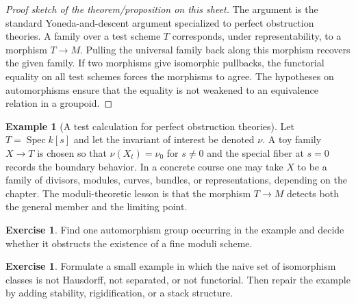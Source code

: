 \documentclass[11pt]{amsart}
\theoremstyle{definition}
\newtheorem{example}[theorem]{Example}
\newtheorem{exercise}[theorem]{Exercise}
\newcommand{\Spec}{\operatorname{Spec}}
\begin{document}
\begin{proof}[Proof sketch of the theorem/proposition on this sheet]
The argument is the standard Yoneda-and-descent argument specialized to perfect obstruction theories.  A family over a test scheme $T$ corresponds, under representability, to a morphism $T\to M$.  Pulling the universal family back along this morphism recovers the given family.  If two morphisms give isomorphic pullbacks, the functorial equality on all test schemes forces the morphisms to agree.  The hypotheses on automorphisms ensure that the equality is not weakened to an equivalence relation in a groupoid.
\end{proof}
\begin{example}[A test calculation for perfect obstruction theories]
Let $T=\Spec k[s]$ and let the invariant of interest be denoted $\nu$.  A toy family $X\to T$ is chosen so that $\nu(X_t)=\nu_0$ for $s\ne0$ and the special fiber at $s=0$ records the boundary behavior.  In a concrete course one may take $X$ to be a family of divisors, modules, curves, bundles, or representations, depending on the chapter.  The moduli-theoretic lesson is that the morphism $T\to M$ detects both the general member and the limiting point.
\end{example}
\begin{exercise}
Find one automorphism group occurring in the example and decide whether it obstructs the existence of a fine moduli scheme.
\end{exercise}
\begin{exercise}
Formulate a small example in which the naive set of isomorphism classes is not Hausdorff, not separated, or not functorial.  Then repair the example by adding stability, rigidification, or a stack structure.
\end{exercise}
\clearpage
\end{document}
